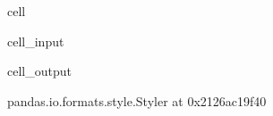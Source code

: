 \documentclass[letterpaper,10pt,english]{jupyterBook}
\begin{document}
\begin{sphinxuseclass}{cell}\begin{sphinxVerbatimInput}

\begin{sphinxuseclass}{cell_input}
\begin{sphinxVerbatim}[commandchars=\\\{\}]
  
\end{sphinxVerbatim}

\end{sphinxuseclass}\end{sphinxVerbatimInput}
\begin{sphinxVerbatimOutput}

\begin{sphinxuseclass}{cell_output}
\begin{sphinxVerbatim}[commandchars=\\\{\}]
\PYGZlt{}pandas.io.formats.style.Styler at 0x2126ac19f40\PYGZgt{}
\end{sphinxVerbatim}

\end{sphinxuseclass}\end{sphinxVerbatimOutput}

\end{sphinxuseclass}
\end{document}
